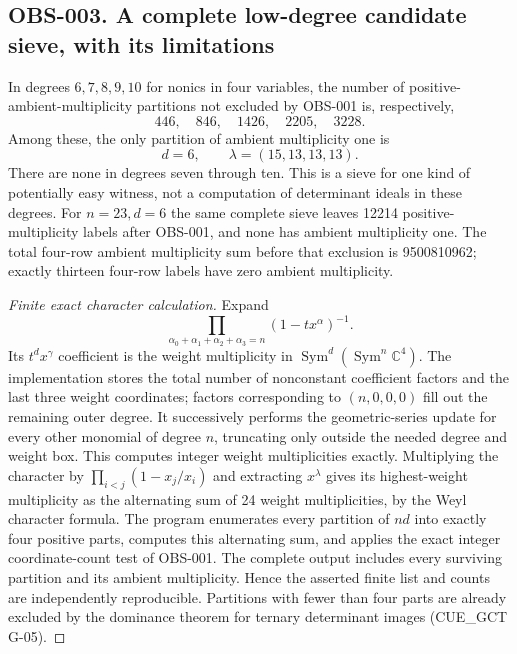 \subsection{OBS-003. A complete low-degree candidate sieve, with its limitations}
In degrees $6,7,8,9,10$ for nonics in four variables, the number of
positive-ambient-multiplicity partitions not excluded by OBS-001 is,
respectively,
\[
                 446,\quad846,\quad1426,\quad2205,\quad3228.
\]
Among these, the only partition of ambient multiplicity one is
\[
                   d=6,\qquad\lambda=(15,13,13,13).
\]
There are none in degrees seven through ten. This is a sieve for one
kind of potentially easy witness, not a computation of determinant
ideals in these degrees.
For $n=23,d=6$ the same complete sieve leaves 12214 positive-multiplicity
labels after OBS-001, and none has ambient multiplicity one. The total
four-row ambient multiplicity sum before that exclusion is 9500810962;
exactly thirteen four-row labels have zero ambient multiplicity.

\begin{proof}[Finite exact character calculation]
Expand
\[
 \prod_{\alpha_0+\alpha_1+\alpha_2+\alpha_3=n}
       (1-tx^\alpha)^{-1}.
\]
Its $t^d x^\gamma$ coefficient is the weight multiplicity in
$\operatorname{Sym}^d(\operatorname{Sym}^n\mathbb C^4)$.
The implementation stores the total number of nonconstant coefficient
factors and the last three weight coordinates; factors corresponding
to $(n,0,0,0)$ fill out the remaining outer degree. It successively
performs the geometric-series update for every other monomial of degree
$n$, truncating only outside the needed degree and weight box. This
computes integer weight multiplicities exactly. Multiplying the
character by $\prod_{i<j}(1-x_j/x_i)$ and extracting $x^\lambda$
gives its highest-weight multiplicity as the alternating sum of 24
weight multiplicities, by the Weyl character formula. The program
enumerates every partition of $nd$ into exactly four positive parts, computes
this alternating sum, and applies the exact integer coordinate-count
test of OBS-001. The complete output includes every surviving partition
and its ambient multiplicity. Hence the asserted finite list and counts
are independently reproducible.
Partitions with fewer than four parts are already excluded by the
dominance theorem for ternary determinant images (CUE\_GCT G-05).
\end{proof}

